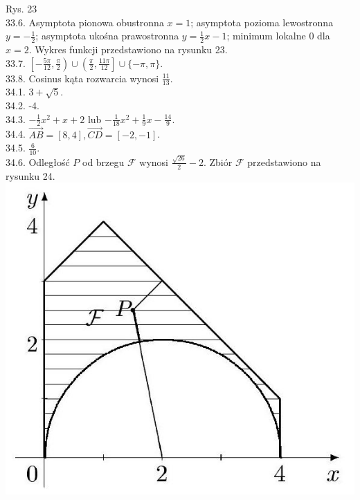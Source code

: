 \documentclass[10pt]{article}
\begin{document}
Rys. 23\\
33.6. Asymptota pionowa obustronna $x=1$; asymptota pozioma lewostronna $y=-\frac{1}{2}$; asymptota ukośna prawostronna $y=\frac{1}{2} x-1$; minimum lokalne 0 dla $x=2$. Wykres funkcji przedstawiono na rysunku 23.\\
33.7. $\left[-\frac{5 \pi}{12}, \frac{\pi}{2}\right) \cup\left(\frac{\pi}{2}, \frac{11 \pi}{12}\right] \cup\{-\pi, \pi\}$.\\
33.8. Cosinus kąta rozwarcia wynosi $\frac{11}{13}$.\\
34.1. $3+\sqrt{5}$.\\
34.2. -4.\\
34.3. $-\frac{1}{2} x^{2}+x+2$ lub $-\frac{1}{18} x^{2}+\frac{1}{9} x-\frac{14}{9}$.\\
34.4. $\overrightarrow{A B}=[8,4], \overrightarrow{C D}=[-2,-1]$.\\
34.5. $\frac{6}{10}$.\\
34.6. Odległość $P$ od brzegu $\mathcal{F}$ wynosi $\frac{\sqrt{26}}{2}-2$. Zbiór $\mathcal{F}$ przedstawiono na rysunku 24.\\
\includegraphics[max width=\textwidth, center]{2024_11_16_fe5b564401bf7db98894g-079}
\end{document}
